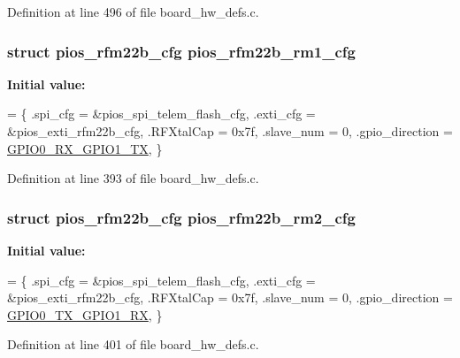 Definition at line 496 of file board\-\_\-hw\-\_\-defs.\-c.

\hypertarget{group___tau_labs_core_ga74080000cc730f990607c938f6984f3e}{
\subsubsection[{pios\-\_\-rfm22b\-\_\-rm1\-\_\-cfg}]{\setlength{\rightskip}{0pt plus 5cm}struct {\bf pios\-\_\-rfm22b\-\_\-cfg} pios\-\_\-rfm22b\-\_\-rm1\-\_\-cfg}}\label{group___tau_labs_core_ga74080000cc730f990607c938f6984f3e}
{\bfseries Initial value\-:}
\begin{DoxyCode}
= \{
        .spi\_cfg = &pios\_spi\_telem\_flash\_cfg,
        .exti\_cfg = &pios\_exti\_rfm22b\_cfg,
        .RFXtalCap = 0x7f,
        .slave\_num = 0,
        .gpio\_direction = \hyperlink{group___p_i_o_s___r_f_m22_b_ggaccc7d029df9e5a96151a68e64f4be7e2a914b463221cba0d76f04cd178ef2d8f0}{GPIO0\_RX\_GPIO1\_TX},
\}
\end{DoxyCode}


Definition at line 393 of file board\-\_\-hw\-\_\-defs.\-c.

\hypertarget{group___tau_labs_core_gacbc9b46e8d0d3813992110ba271f8781}{
\subsubsection[{pios\-\_\-rfm22b\-\_\-rm2\-\_\-cfg}]{\setlength{\rightskip}{0pt plus 5cm}struct {\bf pios\-\_\-rfm22b\-\_\-cfg} pios\-\_\-rfm22b\-\_\-rm2\-\_\-cfg}}\label{group___tau_labs_core_gacbc9b46e8d0d3813992110ba271f8781}
{\bfseries Initial value\-:}
\begin{DoxyCode}
= \{
        .spi\_cfg = &pios\_spi\_telem\_flash\_cfg,
        .exti\_cfg = &pios\_exti\_rfm22b\_cfg,
        .RFXtalCap = 0x7f,
        .slave\_num = 0,
        .gpio\_direction = \hyperlink{group___p_i_o_s___r_f_m22_b_ggaccc7d029df9e5a96151a68e64f4be7e2a87c92cb693852456c28e74d75b67b00a}{GPIO0\_TX\_GPIO1\_RX},
\}
\end{DoxyCode}


Definition at line 401 of file board\-\_\-hw\-\_\-defs.\-c.

